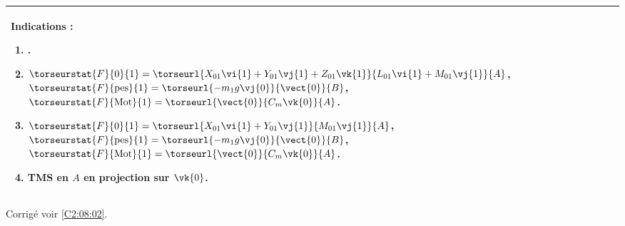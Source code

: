 \ifprof
\else
\footnotesize
\begin{center}
\begin{tabular}{|p{.9\linewidth}|}
\hline
Indications :
\begin{enumerate}
\item .
\item $\torseurstat{F}{0}{1}=\torseurl{X_{01}\vi{1}+Y_{01}\vj{1}+Z_{01}\vk{1}}{L_{01}\vi{1}+M_{01}\vj{1}}{A}$,
$\torseurstat{F}{\text{pes}}{1}=\torseurl{-m_1g\vj{0}}{\vect{0}}{B}$,
$\torseurstat{F}{\text{Mot}}{1}=\torseurl{\vect{0}}{C_m\vk{0}}{A}$.
\item $\torseurstat{F}{0}{1}=\torseurl{X_{01}\vi{1}+Y_{01}\vj{1}}{M_{01}\vj{1}}{A}$,
$\torseurstat{F}{\text{pes}}{1}=\torseurl{-m_1g\vj{0}}{\vect{0}}{B}$,
$\torseurstat{F}{\text{Mot}}{1}=\torseurl{\vect{0}}{C_m\vk{0}}{A}$.
\item TMS en $A$ en projection sur $\vk{0}$.
\end{enumerate} \\ \hline
\end{tabular}
\end{center}
\normalsize
\begin{flushright}
\footnotesize{Corrigé  voir \ref{C2:08:02}.}
\end{flushright}%
\fi